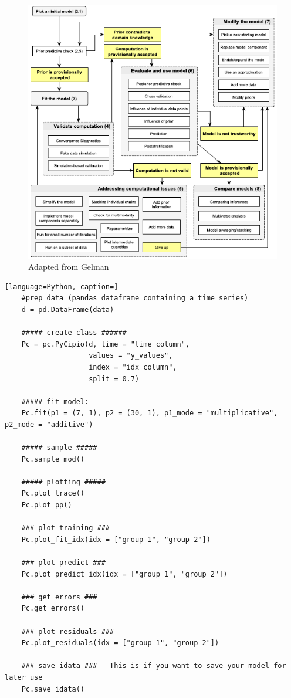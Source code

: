 \documentclass{article}
\begin{document}
\begin{figure}[H]
    \centerline{\includegraphics[scale = 0.5]{images/Gelman.png}}
    \caption{Adapted from Gelman}
\end{figure}

\begin{lstlisting}[language=Python, caption=]
    #prep data (pandas dataframe containing a time series)
    d = pd.DataFrame(data)
    
    ##### create class ######
    Pc = pc.PyCipio(d, time = "time_column", 
                    values = "y_values", 
                    index = "idx_column", 
                    split = 0.7)
    
    ##### fit model: 
    Pc.fit(p1 = (7, 1), p2 = (30, 1), p1_mode = "multiplicative", p2_mode = "additive")
    
    ##### sample #####
    Pc.sample_mod()
    
    ##### plotting #####
    Pc.plot_trace()
    Pc.plot_pp()
    
    ### plot training ###
    Pc.plot_fit_idx(idx = ["group 1", "group 2"])
    
    ### plot predict ###
    Pc.plot_predict_idx(idx = ["group 1", "group 2"])
    
    ### get errors ###
    Pc.get_errors()
    
    ### plot residuals ###
    Pc.plot_residuals(idx = ["group 1", "group 2"])
    
    ### save idata ### - This is if you want to save your model for later use
    Pc.save_idata()
\end{lstlisting}
\end{document}
